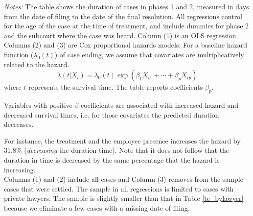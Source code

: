 \begin{table}[!ht]
    \caption{Duration of Cases by Treatment}
    \label{Duration_table}
    \begin{center}
    \scriptsize{}
    \end{center}
     \scriptsize

\textit{Notes:} The table shows the duration of cases in phases 1 and 2, measured in days from the date of filing to the date of the final resolution. All regressions control for the age of the case at the time of treatment, and include dummies for phase 2 and the subcourt where the case was heard. Column (1) is an OLS regression. \\

Columns (2) and (3) are Cox proportional hazards models: For a baseline hazard function ($\lambda_0(t)$) of case ending, we assume that covariates are multiplicatively related to the hazard. 
$$\lambda(t|X_i) = \lambda_0(t)\exp(\beta_1X_{i1} + \cdots + \beta_pX_{ip})$$
where $t$ represents the survival time. The table reports coefficients $\beta_p$.

Variables with positive $\beta$ coefficients are associated with increased hazard and decreased survival times, i.e. for those covariates the predicted duration decreases.

For instance, the treatment and the employee presence increases the hazard by 31.8\% (\emph{decreasing} the duration time). Note that it does not follow that the duration in time is decreased by the same percentage that the hazard is increasing.\\


Columns (1) and (2) include all cases and Column (3) removes from the sample cases that were settled. The sample in all regressions is limited to cases with private lawyers. The sample is slightly smaller than that in Table \ref{te_bylawyer} because we eliminate a few cases with a missing date of filing. 
\end{table}


